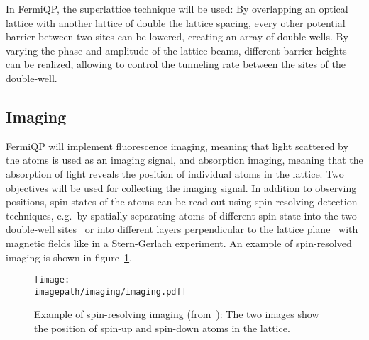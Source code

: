 In FermiQP, the superlattice technique will be used: By overlapping an optical lattice with another lattice of double the lattice spacing, every other potential barrier between two sites can be lowered, creating an array of double-wells. By varying the phase and amplitude of the lattice beams, different barrier heights can be realized, allowing to control the tunneling rate between the sites of the double-well.

\subsection*{Imaging}
FermiQP will implement fluorescence imaging, meaning that light scattered by the atoms is used as an imaging signal, and absorption imaging, meaning that the absorption of light reveals the position of individual atoms in the lattice. Two objectives will be used for collecting the imaging signal. In addition to observing positions, spin states of the atoms can be read out using spin-resolving detection techniques, e.g.~by spatially separating atoms of different spin state into the two double-well sites~\cite{boll_spin-_2016} or into different layers perpendicular to the lattice plane~\cite{koepsell_robust_2020} with magnetic fields like in a Stern-Gerlach experiment. An example of spin-resolved imaging is shown in figure~\ref{fig:absorption_image}.

\begin{figure}
    \centering
    \texttt{[image: \\imagepath/imaging/imaging.pdf]}
    \caption{Example of spin-resolving imaging (from~\cite{koepsell_robust_2020}): The two images show the position of spin-up and spin-down atoms in the lattice.}
    \label{fig:absorption_image}
\end{figure}

